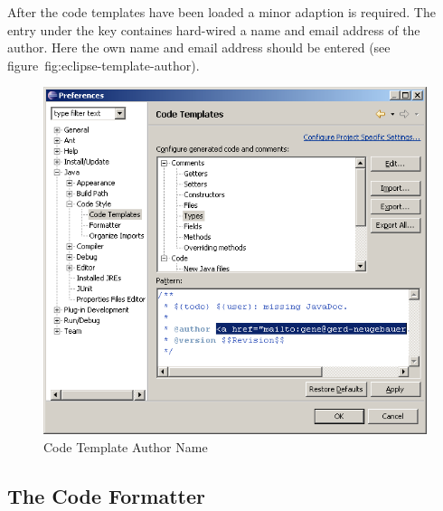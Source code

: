 After the code templates have been loaded a minor adaption is
required. The entry under the key  containes
hard-wired a name and email address of the author. Here the own name
and email address should be entered (see figure~{fig:eclipse-template-author}).
\begin{figure}[htp]
  \centering  \includegraphics[scale=.4]{image/eclipse-template-author}
  \caption{Code Template Author Name}\label{fig:eclipse-template-author}
\end{figure}


\subsection{The Code Formatter}

